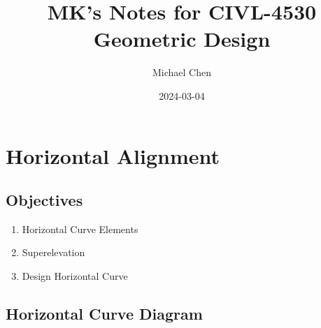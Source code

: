 \documentclass{article}
\title{MK's Notes for CIVL-4530 Geometric Design}
\date{2024-03-04}
\author{Michael Chen}
\begin{document}
  \setcounter{section}{3}




  \section{Horizontal Alignment}
  \subsection{Objectives}
  \begin{enumerate}
    \item Horizontal Curve Elements
    \item Superelevation
    \item Design Horizontal Curve
  \end{enumerate}

  \subsection{Horizontal Curve Diagram}
  
\end{document}

